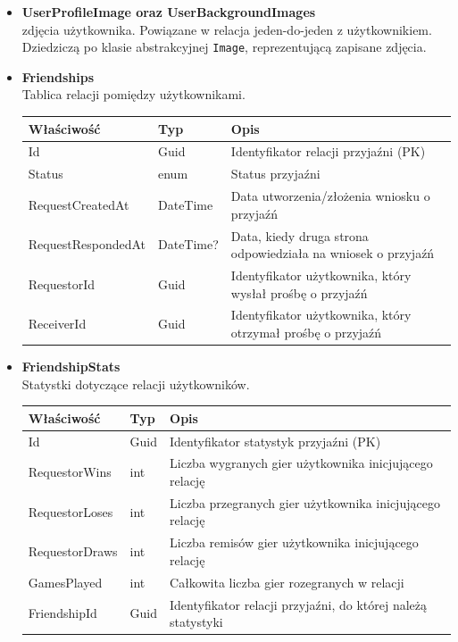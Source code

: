 \documentclass[twoside]{projektInzynierskiMS1}
\begin{document}
\begin{itemize}
    \item \textbf{UserProfileImage oraz UserBackgroundImages}\\
    zdjęcia użytkownika. Powiązane w relacja jeden-do-jeden z użytkownikiem. Dziedziczą po klasie abstrakcyjnej \texttt{Image}, reprezentującą zapisane zdjęcia.

\newpage

    \item \textbf{Friendships}\\
    Tablica relacji pomiędzy użytkownikami.
    \renewcommand{\arraystretch}{1.2}
    \begin{longtable}{|m{4cm}|m{2cm}|m{8cm}|}
        \hline
        \rowcolor{lightgray}
        \textbf{Właściwość} & \textbf{Typ} & \textbf{Opis} \\ \hline
        \endhead
        \hline
        Id & Guid & Identyfikator relacji przyjaźni (PK) \\ \hline
        Status & enum & Status przyjaźni  \\ \hline
        RequestCreatedAt & DateTime & Data utworzenia/złożenia wniosku o przyjaźń \\ \hline
        RequestRespondedAt & DateTime? & Data, kiedy druga strona odpowiedziała na wniosek o przyjaźń \\ \hline
        RequestorId & Guid & Identyfikator użytkownika, który wysłał prośbę o przyjaźń \\ \hline
        ReceiverId & Guid & Identyfikator użytkownika, który otrzymał prośbę o przyjaźń \\ \hline
    \end{longtable}

    \item \textbf{FriendshipStats}\\
    Statystki dotyczące relacji użytkowników.
    \renewcommand{\arraystretch}{1.2}
    \begin{longtable}{|m{4cm}|m{2cm}|m{8cm}|}
        \hline
        \rowcolor{lightgray}
        \textbf{Właściwość} & \textbf{Typ} & \textbf{Opis} \\ \hline
        \endhead
        \hline
        Id & Guid & Identyfikator statystyk przyjaźni (PK) \\ \hline
        RequestorWins & int & Liczba wygranych gier użytkownika inicjującego relację \\ \hline
        RequestorLoses & int & Liczba przegranych gier użytkownika inicjującego relację \\ \hline
        RequestorDraws & int & Liczba remisów gier użytkownika inicjującego relację \\ \hline
        GamesPlayed & int & Całkowita liczba gier rozegranych w relacji \\ \hline
        FriendshipId & Guid & Identyfikator relacji przyjaźni, do której należą statystyki \\ \hline
    \end{longtable}
  

\end{itemize}
\end{document}
